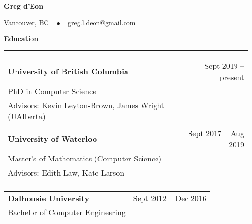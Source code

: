 \documentclass{article}
\newcommand{\heading}[1]
{
	\vspace{3pt}
	\textbf{#1} 
	\vspace{-6pt}
	
	\rule{\linewidth}{0.4pt}
}
\begin{document}
\begin{center}
{\Large\textbf{Greg d'Eon}}

\vspace{0.2cm}
Vancouver, BC ~ $\bullet$ ~ 
greg.l.deon@gmail.com

\end{center}


\heading{Education}
\begin{center}
\begin{tabularx}{\textwidth}{Xr}
    \textbf{University of British Columbia} & Sept 2019 -- present \\
    PhD in Computer Science \\
    Advisors: Kevin Leyton-Brown, James Wright (UAlberta) \\
    \\

	\textbf{University of Waterloo}	& Sept 2017 -- Aug 2019 \\
	Master's of Mathematics (Computer Science) \\
	Advisors: Edith Law, Kate Larson \\
	\\
\end{tabularx}
\begin{tabularx}{\textwidth}{Xr}
	\textbf{Dalhousie University}	& Sept 2012 -- Dec 2016 \\
	Bachelor of Computer Engineering \\
\end{tabularx}
\end{center}
\end{document}
